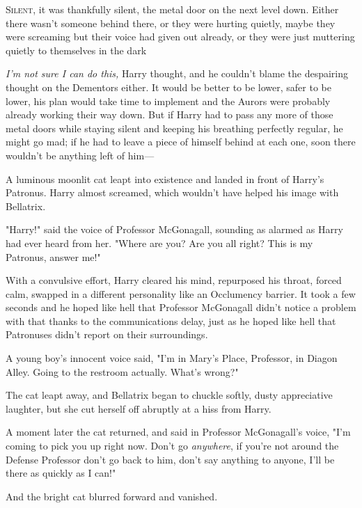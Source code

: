 
\lettrine{S}{ilent}, it was
thankfully silent, the metal door on the next level down. Either there wasn't
someone behind there, or they were hurting quietly, maybe they were screaming
but their voice had given out already, or they were just muttering quietly to
themselves in the dark{\el}

\emph{I'm not sure I can do this,} Harry thought, and he couldn't blame the
despairing thought on the Dementors either. It would be better to be lower,
safer to be lower, his plan would take time to implement and the Aurors were
probably already working their way down. But if Harry had to pass any more of
those metal doors while staying silent and keeping his breathing perfectly
regular, he might go mad; if he had to leave a piece of himself behind at each
one, soon there wouldn't be anything left of him---

A luminous moonlit cat leapt into existence and landed in front of Harry's
Patronus. Harry almost screamed, which wouldn't have helped his image with
Bellatrix.

"Harry!" said the voice of Professor McGonagall, sounding as alarmed as Harry
had ever heard from her. "Where are you? Are you all right? This is my
Patronus, answer me!"

With a convulsive effort, Harry cleared his mind, repurposed his throat, forced
calm, swapped in a different personality like an Occlumency barrier. It took a
few seconds and he hoped like hell that Professor McGonagall didn't notice a
problem with that thanks to the communications delay, just as he hoped like
hell that Patronuses didn't report on their surroundings.

A young boy's innocent voice said, "I'm in Mary's Place, Professor, in Diagon
Alley. Going to the restroom actually. What's wrong?"

The cat leapt away, and Bellatrix began to chuckle softly, dusty appreciative
laughter, but she cut herself off abruptly at a hiss from Harry.

A moment later the cat returned, and said in Professor McGonagall's voice, "I'm
coming to pick you up right now. Don't go \emph{anywhere}, if you're not around
the Defense Professor don't go back to him, don't say anything to anyone, I'll
be there as quickly as I can!"

And the bright cat blurred forward and vanished.

